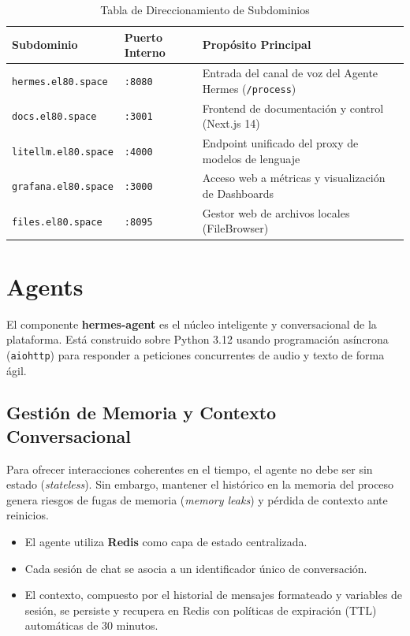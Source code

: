 \documentclass[12pt,a4paper,openany]{book}
\newcommand{\service}[1]{\textbf{\textsf{\color{hermesblue}#1}}}
\newcommand{\code}[1]{\texttt{\small#1}}
\newcommand{\port}[1]{\texttt{:#1}}
\newcommand{\domain}[1]{\texttt{\color{hermesblue}#1}}
\begin{document}
\begin{table}[h]
\centering
\small
\begin{tabularx}{\textwidth}{lXX}
\toprule
\textbf{Subdominio} & \textbf{Puerto Interno} & \textbf{Propósito Principal} \\
\midrule
\domain{hermes.el80.space} & \port{8080} & Entrada del canal de voz del Agente Hermes (\code{/process}) \\
\domain{docs.el80.space} & \port{3001} & Frontend de documentación y control (Next.js 14) \\
\domain{litellm.el80.space} & \port{4000} & Endpoint unificado del proxy de modelos de lenguaje \\
\domain{grafana.el80.space} & \port{3000} & Acceso web a métricas y visualización de Dashboards \\
\domain{files.el80.space} & \port{8095} & Gestor web de archivos locales (FileBrowser) \\
\bottomrule
\end{tabularx}
\caption{Tabla de Direccionamiento de Subdominios}
\label{tab:subdomains}
\end{table}

\chapter{Agents}
El componente \service{hermes-agent} es el núcleo inteligente y conversacional de la plataforma. Está construido sobre Python 3.12 usando programación asíncrona (\code{aiohttp}) para responder a peticiones concurrentes de audio y texto de forma ágil.

\section{Gestión de Memoria y Contexto Conversacional}
Para ofrecer interacciones coherentes en el tiempo, el agente no debe ser sin estado (\textit{stateless}). Sin embargo, mantener el histórico en la memoria del proceso genera riesgos de fugas de memoria (\textit{memory leaks}) y pérdida de contexto ante reinicios.
\begin{itemize}
    \item El agente utiliza \service{Redis} como capa de estado centralizada.
    \item Cada sesión de chat se asocia a un identificador único de conversación.
    \item El contexto, compuesto por el historial de mensajes formateado y variables de sesión, se persiste y recupera en Redis con políticas de expiración (TTL) automáticas de 30 minutos.
\end{itemize}
\end{document}
